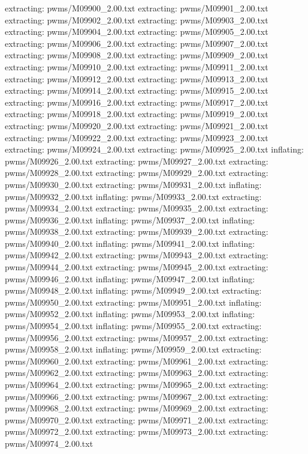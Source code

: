 \documentclass[letterpaper,10pt,english]{sphinxmanual}
\begin{document}
{\begin{sphinxVerbatim}[commandchars=\\\{\}]
 extracting: pwms/M09900\_2.00.txt
 extracting: pwms/M09901\_2.00.txt
 extracting: pwms/M09902\_2.00.txt
 extracting: pwms/M09903\_2.00.txt
 extracting: pwms/M09904\_2.00.txt
 extracting: pwms/M09905\_2.00.txt
 extracting: pwms/M09906\_2.00.txt
 extracting: pwms/M09907\_2.00.txt
 extracting: pwms/M09908\_2.00.txt
 extracting: pwms/M09909\_2.00.txt
 extracting: pwms/M09910\_2.00.txt
 extracting: pwms/M09911\_2.00.txt
 extracting: pwms/M09912\_2.00.txt
 extracting: pwms/M09913\_2.00.txt
 extracting: pwms/M09914\_2.00.txt
 extracting: pwms/M09915\_2.00.txt
 extracting: pwms/M09916\_2.00.txt
 extracting: pwms/M09917\_2.00.txt
 extracting: pwms/M09918\_2.00.txt
 extracting: pwms/M09919\_2.00.txt
 extracting: pwms/M09920\_2.00.txt
 extracting: pwms/M09921\_2.00.txt
 extracting: pwms/M09922\_2.00.txt
 extracting: pwms/M09923\_2.00.txt
 extracting: pwms/M09924\_2.00.txt
 extracting: pwms/M09925\_2.00.txt
  inflating: pwms/M09926\_2.00.txt
 extracting: pwms/M09927\_2.00.txt
 extracting: pwms/M09928\_2.00.txt
 extracting: pwms/M09929\_2.00.txt
 extracting: pwms/M09930\_2.00.txt
 extracting: pwms/M09931\_2.00.txt
  inflating: pwms/M09932\_2.00.txt
  inflating: pwms/M09933\_2.00.txt
 extracting: pwms/M09934\_2.00.txt
 extracting: pwms/M09935\_2.00.txt
 extracting: pwms/M09936\_2.00.txt
  inflating: pwms/M09937\_2.00.txt
  inflating: pwms/M09938\_2.00.txt
 extracting: pwms/M09939\_2.00.txt
 extracting: pwms/M09940\_2.00.txt
  inflating: pwms/M09941\_2.00.txt
  inflating: pwms/M09942\_2.00.txt
 extracting: pwms/M09943\_2.00.txt
 extracting: pwms/M09944\_2.00.txt
 extracting: pwms/M09945\_2.00.txt
 extracting: pwms/M09946\_2.00.txt
  inflating: pwms/M09947\_2.00.txt
  inflating: pwms/M09948\_2.00.txt
  inflating: pwms/M09949\_2.00.txt
 extracting: pwms/M09950\_2.00.txt
 extracting: pwms/M09951\_2.00.txt
  inflating: pwms/M09952\_2.00.txt
  inflating: pwms/M09953\_2.00.txt
  inflating: pwms/M09954\_2.00.txt
  inflating: pwms/M09955\_2.00.txt
 extracting: pwms/M09956\_2.00.txt
 extracting: pwms/M09957\_2.00.txt
 extracting: pwms/M09958\_2.00.txt
  inflating: pwms/M09959\_2.00.txt
 extracting: pwms/M09960\_2.00.txt
 extracting: pwms/M09961\_2.00.txt
 extracting: pwms/M09962\_2.00.txt
 extracting: pwms/M09963\_2.00.txt
 extracting: pwms/M09964\_2.00.txt
 extracting: pwms/M09965\_2.00.txt
 extracting: pwms/M09966\_2.00.txt
 extracting: pwms/M09967\_2.00.txt
 extracting: pwms/M09968\_2.00.txt
 extracting: pwms/M09969\_2.00.txt
 extracting: pwms/M09970\_2.00.txt
 extracting: pwms/M09971\_2.00.txt
 extracting: pwms/M09972\_2.00.txt
 extracting: pwms/M09973\_2.00.txt
 extracting: pwms/M09974\_2.00.txt

\end{sphinxVerbatim}}
\end{document}
